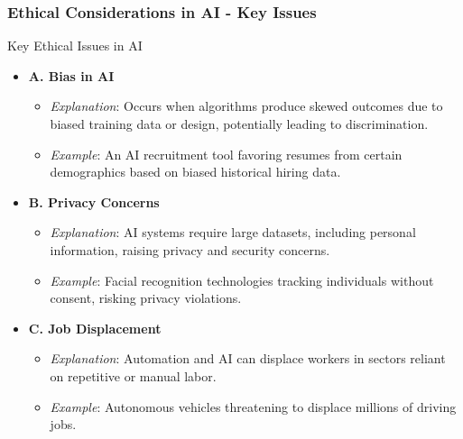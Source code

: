 \documentclass[aspectratio=169]{beamer}
\begin{document}
\begin{frame}[fragile]
    \frametitle{Ethical Considerations in AI - Key Issues}
    \begin{block}{Key Ethical Issues in AI}
        \begin{itemize}
            \item \textbf{A. Bias in AI}
                \begin{itemize}
                    \item \textit{Explanation}: Occurs when algorithms produce skewed outcomes due to biased training data or design, potentially leading to discrimination.
                    \item \textit{Example}: An AI recruitment tool favoring resumes from certain demographics based on biased historical hiring data.
                \end{itemize}
            \item \textbf{B. Privacy Concerns}
                \begin{itemize}
                    \item \textit{Explanation}: AI systems require large datasets, including personal information, raising privacy and security concerns.
                    \item \textit{Example}: Facial recognition technologies tracking individuals without consent, risking privacy violations.
                \end{itemize}
            \item \textbf{C. Job Displacement}
                \begin{itemize}
                    \item \textit{Explanation}: Automation and AI can displace workers in sectors reliant on repetitive or manual labor.
                    \item \textit{Example}: Autonomous vehicles threatening to displace millions of driving jobs.
                \end{itemize}
        \end{itemize}
    \end{block}
\end{frame}
\end{document}
